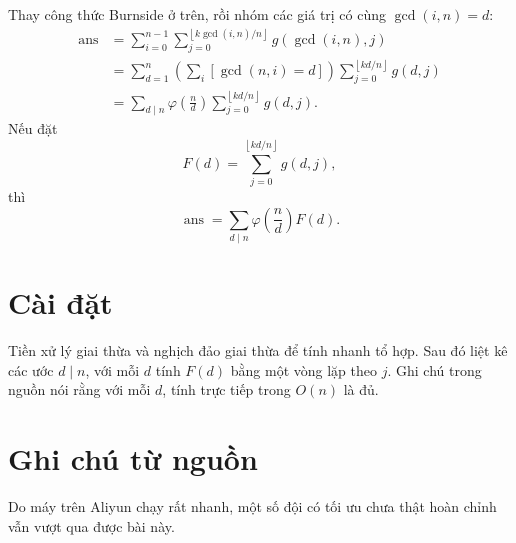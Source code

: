 \documentclass[11pt]{article}
\newcommand{\ans}{\operatorname{ans}}
\begin{document}
Thay công thức Burnside ở trên, rồi nhóm các giá trị có cùng
\(\gcd(i,n)=d\):
\[
\begin{aligned}
  \ans
  &=
  \sum_{i=0}^{n-1}
  \sum_{j=0}^{\left\lfloor k\gcd(i,n)/n\right\rfloor}
  g(\gcd(i,n),j) \\
  &=
  \sum_{d=1}^{n}
  \left(\sum_i [\gcd(n,i)=d]\right)
  \sum_{j=0}^{\left\lfloor kd/n\right\rfloor}g(d,j) \\
  &=
  \sum_{d\mid n}
  \varphi\!\left(\frac{n}{d}\right)
  \sum_{j=0}^{\left\lfloor kd/n\right\rfloor}g(d,j).
\end{aligned}
\]
Nếu đặt
\[
  F(d)=\sum_{j=0}^{\left\lfloor kd/n\right\rfloor}g(d,j),
\]
thì
\[
  \ans=\sum_{d\mid n}\varphi\!\left(\frac{n}{d}\right)F(d).
\]

\section{Cài đặt}

Tiền xử lý giai thừa và nghịch đảo giai thừa để tính nhanh tổ hợp. Sau đó
liệt kê các ước \(d\mid n\), với mỗi \(d\) tính \(F(d)\) bằng một vòng lặp
theo \(j\). Ghi chú trong nguồn nói rằng với mỗi \(d\), tính trực tiếp trong
\(O(n)\) là đủ.

\section{Ghi chú từ nguồn}

Do máy trên Aliyun chạy rất nhanh, một số đội có tối ưu chưa thật hoàn chỉnh
vẫn vượt qua được bài này.
\end{document}
